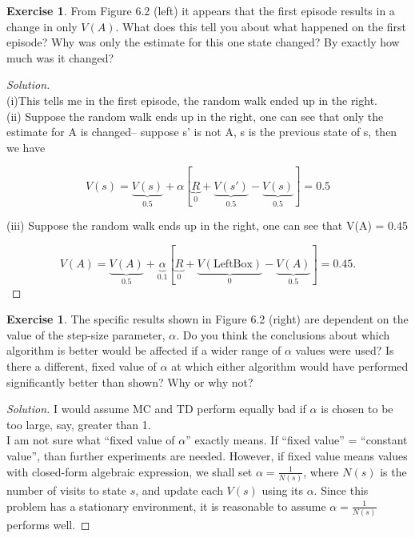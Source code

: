 \documentclass[oneside,11pt]{article}
\theoremstyle{definition}
\newtheorem{exer}[thm]{Exercise}
\newenvironment{solution}
{\renewcommand\qedsymbol{$\blacksquare$}\begin{proof}[Solution]} {\end{proof}}
\begin{document}
\begin{exer}
From Figure 6.2 (left) it appears that the first episode results in a change in only $V(A)$. What does this tell you about what happened on the first episode? Why was only the estimate for this one state changed? By exactly how much was it changed?
\end{exer}

\begin{shaded}
\begin{solution} 
~\\
(i)This tells me in the first episode, the random walk ended up in the right. \\
(ii) Suppose the random walk ends up in the right, one can see that only the estimate for A is changed-- suppose s' is not A, s is the previous state of s, then we have 

\[V(s) = \underbrace{V(s)}_{0.5} + \alpha \left [ \underbrace{R}_{0} + \underbrace{V(s')}_{0.5} - \underbrace{V(s)}_{0.5} \right ] = 0.5\]

(iii) Suppose the random walk ends up in the right, one can see that V(A) = 0.45

\[V(A) = \underbrace{V(A)}_{0.5} + \underbrace{\alpha}_{0.1} \left [ \underbrace{R}_{0} + \underbrace{V(\text{LeftBox})}_{0} - \underbrace{V(A)}_{0.5} \right ] = 0.45. \]
\end{solution} 
\end{shaded}

\begin{exer}
The specific results shown in Figure 6.2 (right) are dependent on the value of the step-size parameter, $\alpha$. Do you think the conclusions about which algorithm is better would be affected if a wider range of $\alpha$ values were used? Is there a different, fixed value of $\alpha$ at which either algorithm would have performed significantly better than shown? Why or why not?
\end{exer}

\begin{shaded}
\begin{solution} 

I would assume MC and TD perform equally bad if $\alpha$ is chosen to be too large, say, greater than 1. \\

I am not sure what ``fixed value of $\alpha$'' exactly means. If ``fixed value'' = ``constant value'', than further experiments are needed. However, if fixed value means values with closed-form algebraic expression, we shall set $\alpha = \frac{1}{N(s)}$, where $N(s)$ is the number of visits to state $s$, and update each $V(s)$ using its $\alpha$. Since this problem has a stationary environment, it is reasonable to assume $\alpha = \frac{1}{N(s)}$ performs well.


\end{solution} 
\end{shaded}
\end{document}
